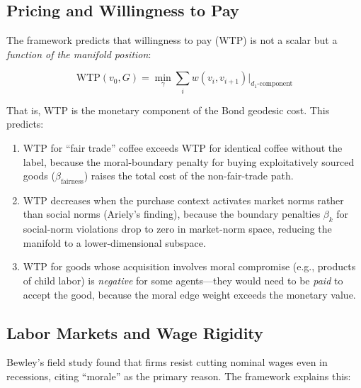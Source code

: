 \documentclass[12pt]{article}
\theoremstyle{definition}
\theoremstyle{remark}
\begin{document}
\subsection{Pricing and Willingness to Pay}

The framework predicts that willingness to pay (WTP) is not a scalar but a \emph{function of the manifold position}:

\begin{equation}
\text{WTP}(v_0, G) = \min_\gamma \sum_{i} w(v_i, v_{i+1}) \Big|_{d_1\text{-component}}
\label{eq:wtp}
\end{equation}

That is, WTP is the monetary component of the Bond geodesic cost.  This predicts:
\begin{enumerate}
    \item WTP for ``fair trade'' coffee exceeds WTP for identical coffee without the label, because the moral-boundary penalty for buying exploitatively sourced goods ($\beta_{\text{fairness}}$) raises the total cost of the non-fair-trade path.
    \item WTP decreases when the purchase context activates market norms rather than social norms (Ariely's finding), because the boundary penalties $\beta_k$ for social-norm violations drop to zero in market-norm space, reducing the manifold to a lower-dimensional subspace.
    \item WTP for goods whose acquisition involves moral compromise (e.g., products of child labor) is \emph{negative} for some agents---they would need to be \emph{paid} to accept the good, because the moral edge weight exceeds the monetary value.
\end{enumerate}

\subsection{Labor Markets and Wage Rigidity}

Bewley's \cite{bewley1999} field study found that firms resist cutting nominal wages even in recessions, citing ``morale'' as the primary reason.  The framework explains this:
\end{document}

